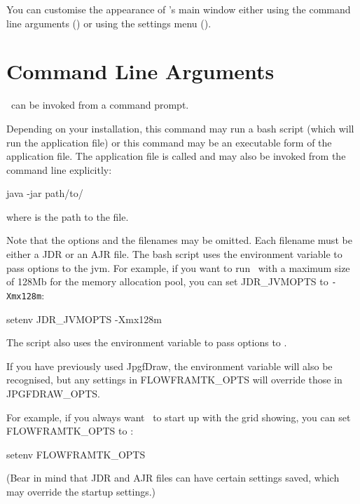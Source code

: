 You can customise the appearance of \FlowframTk's main window either
using the command line arguments () or
using the settings menu ().

\section{Command Line Arguments}\label{sec:cmdargs}

\FlowframTk\ can be invoked from a command prompt. 


Depending on your installation, this command may run a bash script
(which will run the application  file) or this command may
be an executable form of the application  file.
The application  file is called 
and may also be invoked from the command line explicitly:
\begin{terminal}
java -jar path/to/
\end{terminal}
where  is the path to the 
file.

Note that the options and the filenames may be omitted.
Each filename must be either a \gls{JDR} or an \gls{AJR} file.
The  bash script uses the environment variable 
 to pass
options to the \gls{jvm}.  For example, if you want to run \FlowframTk\ with
a maximum size of 128Mb for the memory allocation pool, you can set
\gls{JDR_JVMOPTS} to \verb|-Xmx128m|:
\begin{terminal}
setenv \gls{JDR_JVMOPTS} -Xmx128m
\end{terminal}
The  script also uses the environment variable
 to pass options to \FlowframTk.

\begin{information}
If you have previously used \gls{JpgfDraw}, the  
environment variable will also be recognised, but any settings in 
\gls{FLOWFRAMTK_OPTS} will override those in \gls{JPGFDRAW_OPTS}.
\end{information}

For example, if you always want \FlowframTk\ to start up with the grid showing,
 you can set \gls{FLOWFRAMTK_OPTS} to :
\begin{terminal}
setenv \gls{FLOWFRAMTK_OPTS} 
\end{terminal}
(Bear in mind that \gls{JDR} and \gls{AJR} files can have certain
settings saved, which may override the startup settings.)

